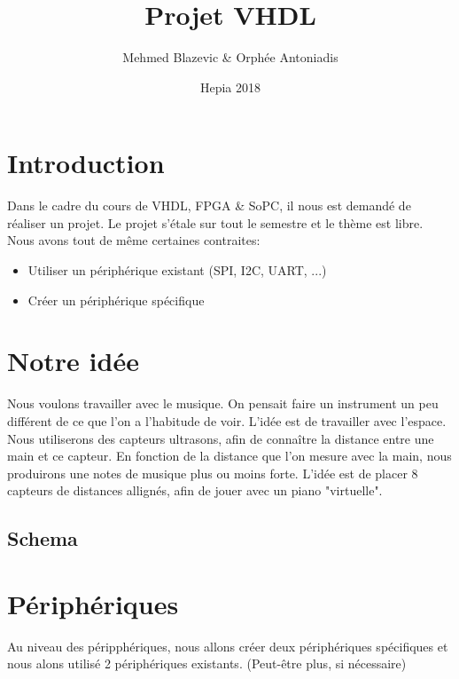 \documentclass{article}
\title{Projet VHDL}
\author{Mehmed Blazevic & Orphée Antoniadis}
\date{Hepia 2018}
\begin{document}
\maketitle

\section{Introduction}
Dans le cadre du cours de VHDL, FPGA \& SoPC, il nous est demandé de réaliser un projet. Le projet s'étale sur tout le semestre et le thème est libre. Nous avons tout de même certaines contraites:

\begin{itemize}
    \item Utiliser un périphérique existant (SPI, I2C, UART, ...)
    \item Créer un périphérique spécifique
\end{itemize}

\section{Notre idée}
Nous voulons travailler avec le musique. On pensait faire un instrument un peu différent de ce que l'on a l'habitude de voir. L'idée est de travailler avec l'espace. Nous utiliserons des capteurs ultrasons, afin de connaître la distance entre une main et ce capteur. En fonction de la distance que l'on mesure avec la main, nous produirons une notes de musique plus ou moins forte. L'idée est de placer 8 capteurs de distances allignés, afin de jouer avec un piano "virtuelle". 

\subsection{Schema}

\begin{center}
\noindent{}
\end{center}

\section{Périphériques}
Au niveau des péripphériques, nous allons créer deux périphériques spécifiques et nous alons utilisé 2 périphériques existants. (Peut-être plus, si nécessaire)
\end{document}
